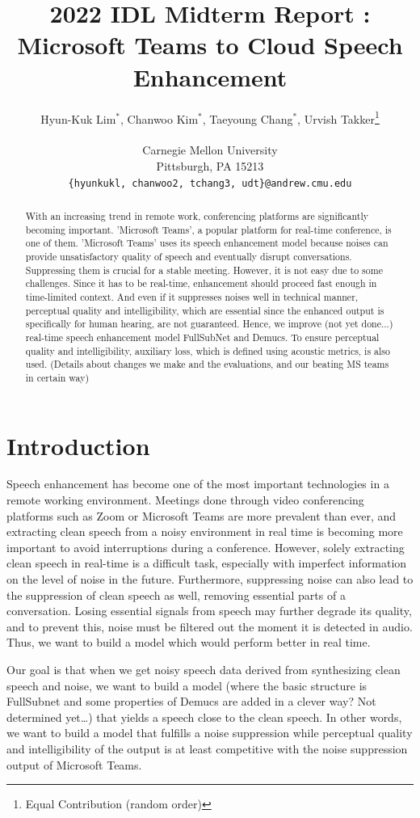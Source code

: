 \documentclass{article}
\title{2022 IDL Midterm Report : \\ Microsoft Teams to Cloud Speech Enhancement}
\author{%
  Hyun-Kuk Lim$^*$, Chanwoo Kim$^*$, Taeyoung Chang$^*$, Urvish Takker\thanks{Equal Contribution (random order)} \\ \\
  Carnegie Mellon University\\
  Pittsburgh, PA 15213 \\
  \texttt{\{hyunkukl, chanwoo2, tchang3, udt\}@andrew.cmu.edu} \\
}
\begin{document}
\maketitle

\begin{abstract}
    With an increasing trend in remote work, conferencing platforms are significantly becoming important. 'Microsoft Teams', a popular platform for real-time conference, is one of them. 'Microsoft Teams' uses its speech enhancement model because noises can provide unsatisfactory quality of speech and eventually disrupt conversations. Suppressing them is crucial for a stable meeting. However, it is not easy due to some challenges. Since it has to be real-time, enhancement should proceed fast enough in time-limited context. And even if it suppresses noises well in technical manner, perceptual quality and intelligibility, which are essential since the enhanced output is specifically for human hearing, are not guaranteed. Hence, we improve (not yet done...) real-time speech enhancement model FullSubNet and Demucs. To ensure perceptual quality and intelligibility, auxiliary loss, which is defined using acoustic metrics, is also used. (Details about changes we make and the evaluations, and our beating MS teams in certain way)
\end{abstract}

\section{Introduction}

Speech enhancement has become one of the most important technologies in a remote working environment.  Meetings done through video conferencing platforms such as Zoom or Microsoft Teams are more prevalent than ever, and extracting clean speech from a noisy environment in real time is becoming more important to avoid interruptions during a conference. However, solely extracting clean speech in real-time is a difficult task, especially with imperfect information on the level of noise in the future. Furthermore, suppressing noise can also lead to the suppression of clean speech as well, removing essential parts of a conversation. Losing essential signals from speech may further degrade its quality, and to prevent this, noise must be filtered out the moment it is detected in audio. Thus, we want to build a model which would perform better in real time. 

Our goal is that when we get noisy speech data derived from synthesizing clean speech and noise, we want to build a model (where the basic structure is FullSubnet and some properties of Demucs are added in a clever way? Not determined yet…) that yields a speech close to the clean speech. In other words, we want to build a model that fulfills a noise suppression while perceptual quality and intelligibility of the output is at least competitive with the noise suppression output of Microsoft Teams. 
\end{document}
